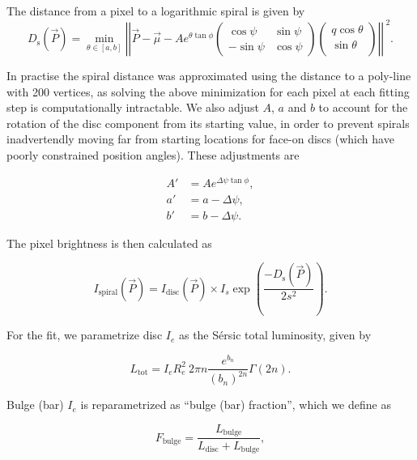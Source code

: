 \documentclass[../main.tex]{subfiles}
\begin{document}
The distance from a pixel to a logarithmic spiral is given by
\begin{equation}
  D_\mathrm{s}(\vec{P}) = \min_{\theta\in[a, b]}\left|\left|\vec{P} - \vec\mu - Ae^{\theta\tan\phi}\begin{pmatrix}
       \cos\psi & \sin\psi\\
       -\sin\psi & \cos\psi
       \end{pmatrix}
       \begin{pmatrix}
       q\cos\theta \\
       \sin\theta \\
       \end{pmatrix}
       \right|\right|^{\ 2}.
\end{equation}

In practise the spiral distance was approximated using the distance to a poly-line with 200 vertices, as solving the above minimization for each pixel at each fitting step is computationally intractable. We also adjust $A$, $a$ and $b$ to account for the rotation of the disc component from its starting value, in order to prevent spirals inadvertendly moving far from starting locations for face-on discs (which have poorly constrained position angles). These adjustments are

\begin{equation}
\begin{aligned}
  A' &= Ae^{\Delta\psi\tan\phi},\\
  a' &= a - \Delta\psi,\\
  b' &= b - \Delta\psi.
\end{aligned}
\end{equation}

The pixel brightness is then calculated as

\begin{equation}
I_\mathrm{spiral}(\vec{P}) = I_\mathrm{disc}(\vec{P}) \times I_s\exp\left(\frac{-D_\mathrm{s}(\vec{P})}{2s^2}\right).
\end{equation}

For the fit, we parametrize disc $I_e$ as the S\'ersic total luminosity, given by

\begin{equation}
L_\mathrm{tot} = I_eR_e^2\ 2\pi n\frac{e^{b_n}}{(b_n)^{2n}}\Gamma(2n).
\end{equation}

Bulge (bar) $I_e$ is reparametrized as ``bulge (bar) fraction'', which we define as

\begin{equation}
F_\mathrm{bulge} = \frac{L_\mathrm{bulge}}{L_\mathrm{disc} + L_\mathrm{bulge}},
\end{equation}
\end{document}

